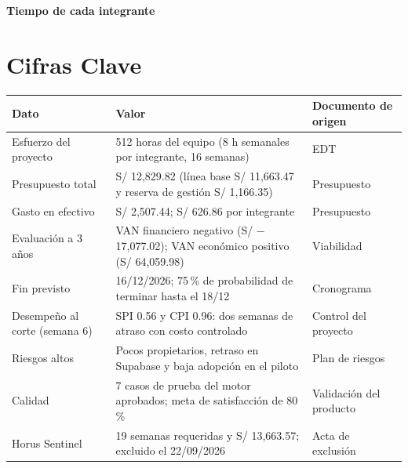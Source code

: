 \documentclass[11pt,a4paper]{article}
\begin{document}
\vspace{0.1cm}
\noindent\textbf{Tiempo de cada integrante}
\begin{center}
\end{center}

\section{Cifras Clave}
{\small
{}
\noindent\begin{tabularx}{\textwidth}{@{}P{4.2cm} L P{3.2cm}@{}}
\toprule
{}
\textbf{Dato} & \textbf{Valor} & \textbf{Documento de origen} \\
\midrule
Esfuerzo del proyecto & 512 horas del equipo (8 h semanales por integrante, 16 semanas) & EDT \\
Presupuesto total & S/ 12,829.82 (línea base S/ 11,663.47 y reserva de gestión S/ 1,166.35) & Presupuesto \\
Gasto en efectivo & S/ 2,507.44; S/ 626.86 por integrante & Presupuesto \\
Evaluación a 3 años & VAN financiero negativo (S/ $-$17,077.02); VAN económico positivo (S/ 64,059.98) & Viabilidad \\
Fin previsto & 16/12/2026; 75\,\% de probabilidad de terminar hasta el 18/12 & Cronograma \\
Desempeño al corte (semana 6) & SPI 0.56 y CPI 0.96: dos semanas de atraso con costo controlado & Control del proyecto \\
Riesgos altos & Pocos propietarios, retraso en Supabase y baja adopción en el piloto & Plan de riesgos \\
Calidad & 7 casos de prueba del motor aprobados; meta de satisfacción de 80\,\% & Validación del producto \\
Horus Sentinel & 19 semanas requeridas y S/ 13,663.57; excluido el 22/09/2026 & Acta de exclusión \\
\bottomrule
\end{tabularx}
}
\end{document}
